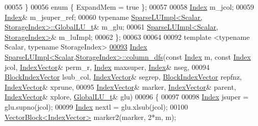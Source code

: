 \begin{DoxyCode}
00055   \}
00056   \textcolor{keyword}{enum} \{ ExpandMem = \textcolor{keyword}{true} \};
00057   
00058   \hyperlink{namespace_eigen_a62e77e0933482dafde8fe197d9a2cfde}{Index} m\_jcol;
00059   \hyperlink{namespace_eigen_a62e77e0933482dafde8fe197d9a2cfde}{Index}& m\_jsuper\_ref;
00060   \textcolor{keyword}{typename} \hyperlink{struct_eigen_1_1internal_1_1_l_u___global_l_u__t}{SparseLUImpl<Scalar, StorageIndex>::GlobalLU\_t}& 
      m\_glu;
00061   \hyperlink{group___sparse_l_u___module_class_eigen_1_1internal_1_1_sparse_l_u_impl}{SparseLUImpl<Scalar, StorageIndex>}& m\_luImpl;
00062 \};
00063 
00064 
00092 \textcolor{keyword}{template} <\textcolor{keyword}{typename} Scalar, \textcolor{keyword}{typename} StorageIndex>
\hyperlink{group___sparse_l_u___module_a6f543ae02eb6467e9bcc1e5cec8ccdd2}{00093} \hyperlink{namespace_eigen_a62e77e0933482dafde8fe197d9a2cfde}{Index} \hyperlink{group___sparse_l_u___module_a6f543ae02eb6467e9bcc1e5cec8ccdd2}{SparseLUImpl<Scalar,StorageIndex>::column\_dfs}(\textcolor{keyword}{const}
       \hyperlink{namespace_eigen_a62e77e0933482dafde8fe197d9a2cfde}{Index} m, \textcolor{keyword}{const} \hyperlink{namespace_eigen_a62e77e0933482dafde8fe197d9a2cfde}{Index} jcol, \hyperlink{group___core___module_class_eigen_1_1_matrix}{IndexVector}& perm\_r, \hyperlink{namespace_eigen_a62e77e0933482dafde8fe197d9a2cfde}{Index} maxsuper, 
      \hyperlink{namespace_eigen_a62e77e0933482dafde8fe197d9a2cfde}{Index}& nseg,
00094                                                     \hyperlink{group___core___module_class_eigen_1_1_ref}{BlockIndexVector} lsub\_col, 
      \hyperlink{group___core___module_class_eigen_1_1_matrix}{IndexVector}& segrep, \hyperlink{group___core___module_class_eigen_1_1_ref}{BlockIndexVector} repfnz, 
      \hyperlink{group___core___module_class_eigen_1_1_matrix}{IndexVector}& xprune,
00095                                                     \hyperlink{group___core___module_class_eigen_1_1_matrix}{IndexVector}& marker, 
      \hyperlink{group___core___module_class_eigen_1_1_matrix}{IndexVector}& parent, \hyperlink{group___core___module_class_eigen_1_1_matrix}{IndexVector}& xplore, \hyperlink{struct_eigen_1_1internal_1_1_l_u___global_l_u__t}{GlobalLU\_t}& glu)
00096 \{
00097   
00098   \hyperlink{namespace_eigen_a62e77e0933482dafde8fe197d9a2cfde}{Index} jsuper = glu.supno(jcol); 
00099   \hyperlink{namespace_eigen_a62e77e0933482dafde8fe197d9a2cfde}{Index} nextl = glu.xlsub(jcol); 
00100   \hyperlink{group___core___module_class_eigen_1_1_vector_block}{VectorBlock<IndexVector>} marker2(marker, 2*m, m); 

\end{DoxyCode}
